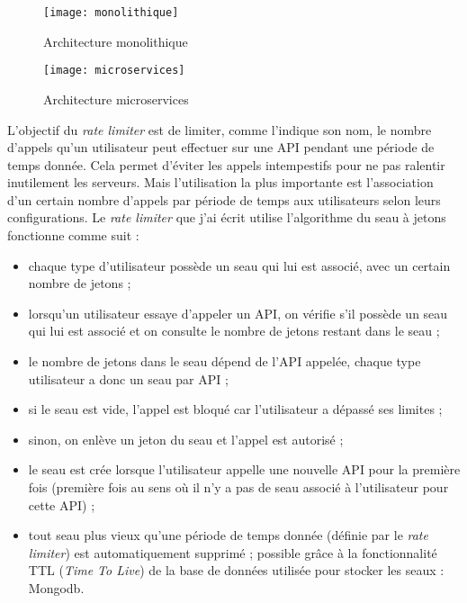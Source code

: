 \begin{figure}[!h]
\centering
\texttt{[image: monolithique]}
\caption{Architecture monolithique}
\end{figure}

\begin{figure}[!h]
\centering
\texttt{[image: microservices]}
\caption{Architecture microservices}
\end{figure}

\vspace{3mm}

L'objectif du \textit{rate limiter} est de limiter, comme l'indique son nom, le nombre d'appels qu'un utilisateur peut effectuer sur une API pendant une période de temps donnée. Cela permet d'éviter les appels intempestifs pour ne pas ralentir inutilement les serveurs. Mais l'utilisation la plus importante est l'association d'un certain nombre d'appels par période de temps aux utilisateurs selon leurs configurations. Le \textit{rate limiter} que j'ai écrit utilise l'algorithme du seau à jetons fonctionne comme suit :
\begin{itemize}[font=\color{blue}, label=]
  \item chaque type d'utilisateur possède un seau qui lui est associé, avec un certain nombre de jetons ;
  \item lorsqu'un utilisateur essaye d'appeler un API, on vérifie s'il possède un seau qui lui est associé et on consulte le nombre de jetons restant dans le seau ;
  \item le nombre de jetons dans le seau dépend de l'API appelée, chaque type utilisateur a donc un seau par API ;
  \item si le seau est vide, l'appel est bloqué car l'utilisateur a dépassé ses limites ;
  \item sinon, on enlève un jeton du seau et l'appel est autorisé ;
  \item le seau est crée lorsque l'utilisateur appelle une nouvelle API pour la première fois (première fois au sens où il n'y a pas de seau associé à l'utilisateur pour cette API) ;
  \item tout seau plus vieux qu'une période de temps donnée (définie par le \textit{rate limiter}) est automatiquement supprimé ; possible grâce à la fonctionnalité TTL (\textit{Time To Live}) de la base de données utilisée pour stocker les seaux : Mongodb.
\end{itemize}

\vspace{3mm}

